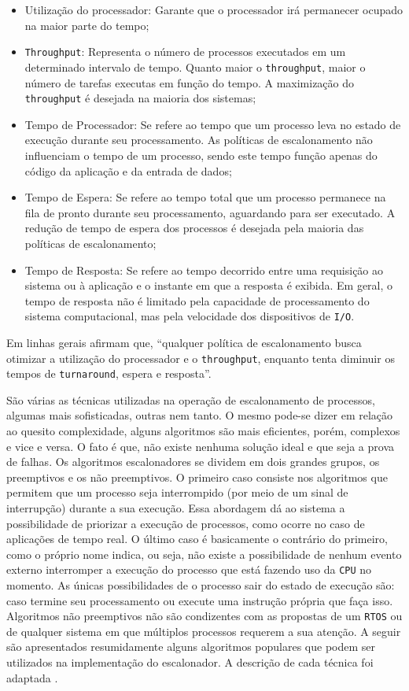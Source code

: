 \begin{itemize}

	\item Utilização do processador: Garante que o processador irá permanecer ocupado na maior parte do tempo;
	\item \texttt{Throughput}: Representa o número de processos executados em um determinado intervalo de tempo. Quanto maior o \texttt{throughput}, maior o número de tarefas executas em função do tempo. A maximização do \texttt{throughput} é desejada na maioria dos sistemas;
	\item Tempo de Processador: Se refere ao tempo que um processo leva no estado de execução durante seu processamento. As políticas de escalonamento não influenciam o tempo de um processo, sendo este tempo função apenas do código da aplicação e da entrada de dados;
	\item Tempo de Espera: Se refere ao tempo total que um processo permanece na fila de pronto durante seu processamento, aguardando para ser executado. A redução de tempo de espera dos processos é desejada pela maioria das políticas de escalonamento; 
	\item Tempo de Resposta: Se refere ao tempo decorrido entre uma requisição ao sistema ou à aplicação e o instante em que a resposta é exibida. Em geral, o tempo de resposta não é limitado pela capacidade de processamento do sistema computacional, mas pela velocidade dos dispositivos de \texttt{I/O}. 

\end{itemize}

Em linhas gerais \cite{machadomaia} afirmam que, “qualquer política de escalonamento busca otimizar a utilização do processador e o \texttt{throughput}, enquanto tenta diminuir os tempos de \texttt{turnaround}, espera e resposta”. 

São várias as técnicas utilizadas na operação de escalonamento de processos, algumas mais sofisticadas, outras nem tanto. O mesmo pode-se dizer em relação ao quesito complexidade, alguns algoritmos são mais eficientes, porém, complexos e vice e versa. O fato é que, não existe nenhuma solução ideal e que seja a prova de falhas. Os algoritmos escalonadores se dividem em dois grandes grupos, os preemptivos e os não preemptivos. O primeiro caso consiste nos algoritmos que permitem que um processo seja interrompido (por meio de um sinal de interrupção) durante a sua execução. Essa abordagem dá ao sistema a possibilidade de priorizar a execução de processos, como ocorre no caso de aplicações de tempo real. O último caso é basicamente o contrário do primeiro, como o próprio nome indica, ou seja, não existe a possibilidade de nenhum evento externo interromper a execução do processo que está fazendo uso da \texttt{CPU} no momento. As únicas possibilidades de o processo sair do estado de execução são: caso termine seu processamento ou execute uma instrução própria que faça isso.  Algoritmos não preemptivos não são condizentes com as propostas de um \texttt{RTOS} ou de qualquer sistema em que múltiplos processos requerem a sua atenção. A seguir são apresentados resumidamente alguns algoritmos populares que podem ser utilizados na implementação do escalonador. A descrição de cada técnica foi adaptada \cite[p.~137-150]{machadomaia}.

